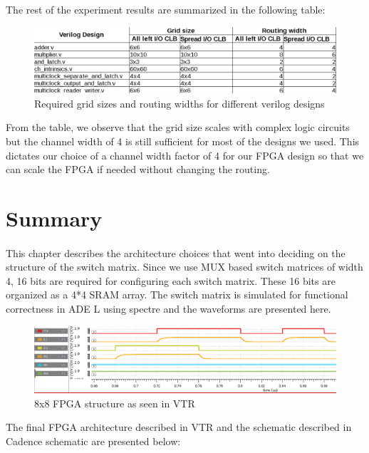 The rest of the experiment results are summarized in the following table:
\begin{figure}[H]
\centering
\includegraphics[scale=0.42]{analysis_table.png}
\caption{Required grid sizes and routing widths for different verilog designs}
\label{fig:Figure}
\end{figure}
From the table, we observe that the grid size scales with complex logic circuits but the channel width of 4 is still sufficient for most of the designs we used. This dictates our choice of a channel width factor of 4 for our FPGA design so that we can scale the FPGA if needed without changing the routing.

\section{Summary}
\paragraph{}
This chapter describes the architecture choices that went into deciding on the structure of the switch matrix. Since we use MUX based switch matrices of width 4, 16 bits are required for configuring each switch matrix. These 16 bits are organized as a 4*4 SRAM array. The switch matrix is simulated for functional correctness in ADE L using spectre and the waveforms are presented here.

\begin{figure}[H]
\centering
\includegraphics[width=\textwidth]{smsimulation.png}
\caption{8x8 FPGA structure as seen in VTR}
\label{fig:Figure}
\end{figure}

The final FPGA architecture described in VTR and the schematic described in Cadence schematic are presented below:

